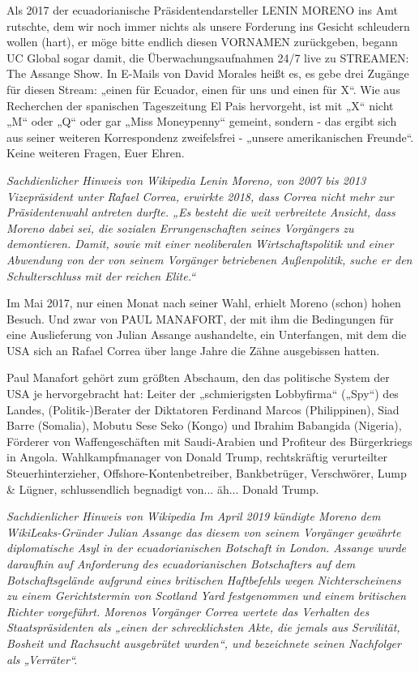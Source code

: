 \begin{multicols}{2}
Als 2017 der ecuadorianische Präsidentendarsteller LENIN MORENO ins Amt rutschte, dem wir noch immer
nichts als unsere Forderung ins Gesicht schleudern wollen (hart), er möge bitte endlich diesen VORNAMEN
zurückgeben, begann UC Global sogar damit, die Überwachungsaufnahmen 24/7 live zu STREAMEN: The Assange Show. In E-Mails von David Morales heißt es, es
gebe drei Zugänge für diesen Stream: „einen für Ecuador, einen für uns und einen für X“. Wie aus Recherchen
der spanischen Tageszeitung El Pais hervorgeht, ist mit
„X“ nicht „M“ oder „Q“ oder gar „Miss Moneypenny“
gemeint, sondern - das ergibt sich aus seiner weiteren
Korrespondenz zweifelsfrei - „unsere amerikanischen
Freunde“. Keine weiteren Fragen, Euer Ehren.

\textit{Sachdienlicher Hinweis von Wikipedia \linebreak
Lenin Moreno, von 2007 bis 2013 Vizepräsident unter Rafael Correa, erwirkte 2018, dass Correa nicht mehr zur
Präsidentenwahl antreten durfte. „Es besteht die weit verbreitete Ansicht, dass Moreno dabei sei, die sozialen Errungenschaften seines Vorgängers zu demontieren. Damit, sowie mit einer neoliberalen Wirtschaftspolitik und
einer Abwendung von der von seinem Vorgänger betriebenen Außenpolitik, suche er den Schulterschluss mit der
reichen Elite.“}

Im Mai 2017, nur einen Monat nach seiner Wahl, erhielt
Moreno (schon) hohen Besuch. Und zwar von PAUL MANAFORT, der mit ihm die Bedingungen für eine Auslieferung von Julian Assange aushandelte, ein Unterfangen,
mit dem die USA sich an Rafael Correa über lange Jahre
die Zähne ausgebissen hatten.

Paul Manafort gehört zum größten Abschaum, den das
politische System der USA je hervorgebracht hat: Leiter der „schmierigsten Lobbyfirma“ („Spy“) des Landes, (Politik-)Berater der Diktatoren Ferdinand Marcos
(Philippinen), Siad Barre (Somalia), Mobutu Sese Seko
(Kongo) und Ibrahim Babangida (Nigeria), Förderer von
Waffengeschäften mit Saudi-Arabien und Profiteur des
Bürgerkriegs in Angola. Wahlkampfmanager von Donald
Trump, rechtskräftig verurteilter Steuerhinterzieher,
Offshore-Kontenbetreiber, Bankbetrüger, Verschwörer,
Lump \& Lügner, schlussendlich begnadigt von... äh...
Donald Trump.

\textit{Sachdienlicher Hinweis von Wikipedia \linebreak
Im April 2019 kündigte Moreno dem WikiLeaks-Gründer
Julian Assange das diesem von seinem Vorgänger gewährte diplomatische Asyl in der ecuadorianischen Botschaft
in London. Assange wurde daraufhin auf Anforderung
des ecuadorianischen Botschafters auf dem Botschaftsgelände aufgrund eines britischen Haftbefehls wegen
Nichterscheinens zu einem Gerichtstermin von Scotland
Yard festgenommen und einem britischen Richter vorgeführt. Morenos Vorgänger Correa wertete das Verhalten
des Staatspräsidenten als „einen der schrecklichsten Akte,
die jemals aus Servilität, Bosheit und Rachsucht ausgebrütet wurden“, und bezeichnete seinen Nachfolger als
„Verräter“.}


\end{multicols}
